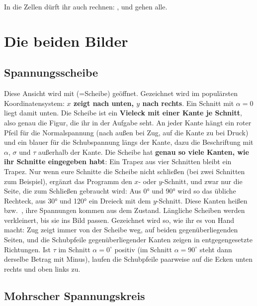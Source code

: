 In die Zellen dürft ihr auch rechnen: ,  und  gehen alle.

\section{Die beiden Bilder}

\subsection{Spannungsscheibe}

Diese Ansicht wird mit  (=Scheibe) geöffnet. Gezeichnet wird im populärsten Koordinatensystem:
\textbf{$x$ zeigt nach unten, $y$ nach rechts}. Ein Schnitt mit
$\alpha = 0$ liegt damit unten. Die Scheibe ist ein \textbf{Vieleck mit einer Kante je
Schnitt}, also genau die Figur, die ihr in der Aufgabe seht. An jeder Kante hängt ein roter
Pfeil für die Normalspannung (nach außen bei Zug, auf die Kante zu bei Druck) und ein blauer für
die Schubspannung längs der Kante, dazu die Beschriftung mit $\alpha$, $\sigma$ und $\tau$
außerhalb der Kante. Die Scheibe hat \textbf{genau so viele Kanten, wie ihr Schnitte eingegeben
habt}: Ein Trapez aus vier Schnitten bleibt ein Trapez. Nur wenn eure Schnitte die Scheibe nicht
schließen (bei zwei Schnitten zum Beispiel), ergänzt das Programm den $x$- oder $y$-Schnitt, und
zwar nur die Seite, die zum Schließen gebraucht wird: Aus 0° und 90° wird so das übliche Rechteck,
aus 30° und 120° ein Dreieck mit dem $y$-Schnitt. Diese Kanten heißen  bzw.\
, ihre Spannungen kommen aus dem Zustand. Längliche Scheiben werden verkleinert,
bis sie ins Bild passen. Gezeichnet wird so, wie ihr es von Hand macht: Zug zeigt immer von der Scheibe weg, auf beiden
gegenüberliegenden Seiten, und die Schubpfeile gegenüberliegender Kanten zeigen in
entgegengesetzte Richtungen. Ist $\tau$ im Schnitt $\alpha = 0^\circ$ positiv (im Schnitt
$\alpha = 90^\circ$ steht dann derselbe Betrag mit Minus), laufen die Schubpfeile paarweise auf die
Ecken unten rechts und oben links zu.

\subsection{Mohrscher Spannungskreis}


